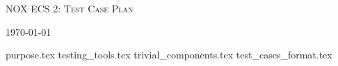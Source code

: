 \documentclass{article}
\begin{document}
\begin{titlepage}
    \centering
    {\scshape\LARGE NOX ECS 2: Test Case Plan \par}
    \vfill
    {\large \today\par}
\end{titlepage}

\tableofcontents
\pagebreak


{purpose.tex}
{testing_tools.tex}
{trivial_components.tex}
{test_cases_format.tex}
\end{document}
